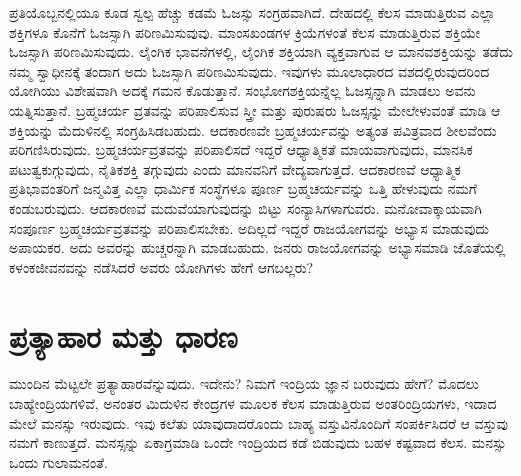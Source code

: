 ಪ್ರತಿಯೊಬ್ಬನಲ್ಲಿಯೂ ಕೂಡ ಸ್ವಲ್ಪ ಹೆಚ್ಚು ಕಡಮೆ ಓಜಸ್ಸು ಸಂಗ್ರಹವಾಗಿದೆ. ದೇಹದಲ್ಲಿ ಕೆಲಸ ಮಾಡುತ್ತಿರುವ ಎಲ್ಲಾ ಶಕ್ತಿಗಳೂ ಕೊನೆಗೆ ಓಜಸ್ಸಾಗಿ ಪರಿಣಮಿಸುವುವು. ಮಾಂಸಖಂಡಗಳ ಕ್ರಿಯೆಗಳಂತೆ ಕೆಲಸ ಮಾಡುತ್ತಿರುವ ಶಕ್ತಿಯೇ ಓಜಸ್ಸಾಗಿ ಪರಿಣಮಿಸುವುದು. ಲೈಂಗಿಕ ಭಾವನೆಗಳಲ್ಲಿ, ಲೈಂಗಿಕ ಶಕ್ತಿಯಾಗಿ ವ್ಯಕ್ತವಾಗುವ ಆ ಮಾನವಶಕ್ತಿಯನ್ನು ತಡೆದು ನಮ್ಮ ಸ್ವಾಧೀನಕ್ಕೆ ತಂದಾಗ ಅದು ಓಜಸ್ಸಾಗಿ ಪರಿಣಮಿಸುವುದು. ಇವುಗಳು ಮೂಲಾಧಾರದ ವಶದಲ್ಲಿರುವುದರಿಂದ ಯೋಗಿಯು ವಿಶೇಷವಾಗಿ ಅದಕ್ಕೆ ಗಮನ ಕೊಡುತ್ತಾನೆ. ಸಂಭೋಗಶಕ್ತಿಯನ್ನೆಲ್ಲ ಓಜಸ್ಸನ್ನಾಗಿ ಮಾಡಲು ಅವನು ಯತ್ನಿಸುತ್ತಾನೆ. ಬ್ರಹ್ಮಚರ್ಯ ವ್ರತವನ್ನು ಪರಿಪಾಲಿಸುವ ಸ್ತ್ರೀ ಮತ್ತು ಪುರುಷರು ಓಜಸ್ಸನ್ನು ಮೇಲೇಳುವಂತೆ ಮಾಡಿ ಆ ಶಕ್ತಿಯನ್ನು ಮೆದುಳಿನಲ್ಲಿ ಸಂಗ್ರಹಿಸಿಡಬಹುದು. ಆದಕಾರಣವೇ ಬ್ರಹ್ಮಚರ್ಯವನ್ನು ಅತ್ಯಂತ ಪವಿತ್ರವಾದ ಶೀಲವೆಂದು ಪರಿಗಣಿಸಿರುವುದು. ಬ್ರಹ್ಮಚರ್ಯವ್ರತವನ್ನು ಪರಿಪಾಲಿಸದೆ ಇದ್ದರೆ ಆಧ್ಯಾತ್ಮಿಕತೆ ಮಾಯವಾಗುವುದು, ಮಾನಸಿಕ ಪಟುತ್ವಕುಗ್ಗುವುದು, ನೈತಿಕಶಕ್ತಿ ತಗ್ಗುವುದು ಎಂದು ಮಾನವನಿಗೆ ವೇದ್ಯವಾಗುತ್ತದೆ. ಆದಕಾರಣವೆ ಆಧ್ಯಾತ್ಮಿಕ ಪ್ರತಿಭಾವಂತರಿಗೆ ಜನ್ಮವಿತ್ತ ಎಲ್ಲಾ ಧಾರ್ಮಿಕ ಸಂಸ್ಥೆಗಳೂ ಪೂರ್ಣ ಬ್ರಹ್ಮಚರ್ಯವನ್ನು ಒತ್ತಿ ಹೇಳುವುದು ನಮಗೆ ಕಂಡುಬರುವುದು. ಆದಕಾರಣವೆ ಮದುವೆಯಾಗುವುದನ್ನು ಬಿಟ್ಟು ಸಂನ್ಯಾಸಿಗಳಾಗುವರು. ಮನೋವಾಕ್ಕಾಯವಾಗಿ ಸಂಪೂರ್ಣ ಬ್ರಹ್ಮಚರ್ಯವ್ರತವನ್ನು ಪರಿಪಾಲಿಸಬೇಕು. ಅದಿಲ್ಲದೆ ಇದ್ದರೆ ರಾಜಯೋಗವನ್ನು ಅಭ್ಯಾಸ ಮಾಡುವುದು ಅಪಾಯಕರ. ಅದು ಅವರನ್ನು ಹುಚ್ಚರನ್ನಾಗಿ ಮಾಡಬಹುದು. ಜನರು ರಾಜಯೋಗವನ್ನು ಅಭ್ಯಾಸಮಾಡಿ ಜೊತೆಯಲ್ಲಿ ಕಳಂಕಜೀವನವನ್ನು ನಡೆಸಿದರೆ ಅವರು ಯೋಗಿಗಳು ಹೇಗೆ ಆಗಬಲ್ಲರು?

\chapter{ಪ್ರತ್ಯಾಹಾರ ಮತ್ತು ಧಾರಣ}

ಮುಂದಿನ ಮೆಟ್ಟಲೇ ಪ್ರತ್ಯಾಹಾರವೆನ್ನುವುದು. ಇದೇನು? ನಿಮಗೆ ಇಂದ್ರಿಯ ಜ್ಞಾನ ಬರುವುದು ಹೇಗೆ? ಮೊದಲು ಬಾಹ್ಯೇಂದ್ರಿಯಗಳಿವೆ, ಅನಂತರ ಮಿದುಳಿನ ಕೇಂದ್ರಗಳ ಮೂಲಕ ಕೆಲಸ ಮಾಡುತ್ತಿರುವ ಅಂತರಿಂದ್ರಿಯಗಳು, ಇದಾದ ಮೇಲೆ ಮನಸ್ಸು ಇರುವುದು. ಇವು ಕಲೆತು ಯಾವುದಾದರೊಂದು ಬಾಹ್ಯ ವಸ್ತುವಿನೊಂದಿಗೆ ಸಂಪರ್ಕಿಸಿದರೆ ಆ ವಸ್ತುವು ನಮಗೆ ಕಾಣುತ್ತದೆ. ಮನಸ್ಸನ್ನು ಏಕಾಗ್ರಮಾಡಿ ಒಂದೇ ಇಂದ್ರಿಯದ ಕಡೆ ಬಿಡುವುದು ಬಹಳ ಕಷ್ಟವಾದ ಕೆಲಸ. ಮನಸ್ಸು ಒಂದು ಗುಲಾಮನಂತೆ. 

\vskip 6pt

